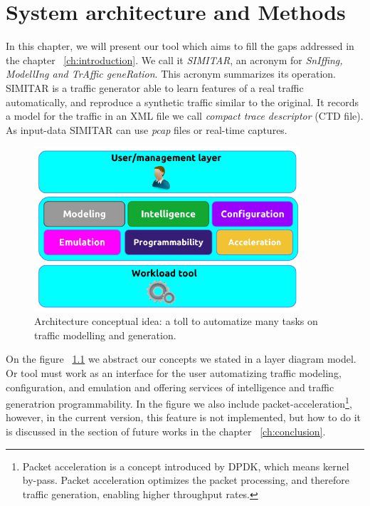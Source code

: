 \chapter{System architecture and Methods}\label{ch:architecture}


In this chapter, we will present our tool which aims to fill the gaps addressed in the chapter ~\ref{ch:introduction}. We call it \textit{SIMITAR}, an acronym for \textit{SnIffing, ModellIng and TrAffic geneRation}.  This acronym summarizes its operation. SIMITAR is a traffic generator able to learn features of a real traffic automatically, and reproduce a synthetic traffic similar to the original. It records a model for the traffic in an XML file we call \textit{compact trace descriptor} (CTD file). As input-data SIMITAR can use \textit{pcap} files or real-time captures.  


\begin{figure}[ht!]
	\centering
	\includegraphics[height=2.4in]{figures/ch1/layer-diagram}
	\caption{ Architecture conceptual idea: a toll to automatize many tasks on traffic modelling and generation.}
	\label{fig:layer-diagram}
\end{figure}

On the figure ~\ref{fig:layer-diagram} we abstract our concepts we stated in a layer diagram model. Or tool must work as an interface for the user automatizing traffic modeling, configuration, and emulation and offering services of intelligence and traffic generatrion programmability. In the figure we also include packet-acceleration\footnote{Packet acceleration is a concept introduced by DPDK\cite{web-dpdk}, which means kernel by-pass. Packet acceleration optimizes the packet processing, and therefore traffic generation, enabling higher throughput rates.}, however, in the current version, this feature is not implemented, but how to do it is discussed in the section of future works in the chapter ~\ref{ch:conclusion}.


